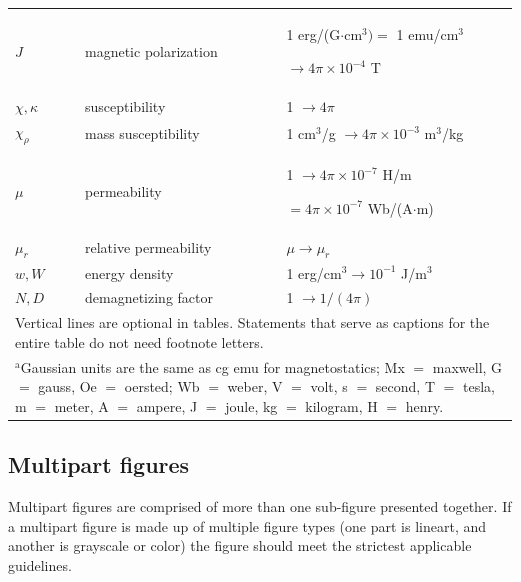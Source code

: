 \documentclass[journal,twoside,web]{ieeecolor}
\begin{document}
\begin{table}
\begin{tabular}{|p{25pt}|p{75pt}|p{115pt}|}
        $J$                                            &
        magnetic polarization                          &
        1 erg/(G$\cdot $cm$^{3}) =$ 1 emu/cm$^{3}$ \par $\to 4\pi \times  10^{-4}$ T    \\
        $\chi , \kappa $                               &
        susceptibility                                 &
        1 $\to  4\pi $                                                                  \\
        $\chi_{\rho }$                                 &
        mass susceptibility                            &
        1 cm$^{3}$/g $\to  4\pi \times  10^{-3}$ m$^{3}$/kg                             \\
        $\mu $                                         &
        permeability                                   &
        1 $\to  4\pi \times  10^{-7}$ H/m \par $= 4\pi \times  10^{-7}$ Wb/(A$\cdot $m) \\
        $\mu_{r}$                                      &
        relative permeability                          &
        $\mu \to \mu_{r}$                                                               \\
        $w, W$                                         &
        energy density                                 &
        1 erg/cm$^{3} \to  10^{-1}$ J/m$^{3}$                                           \\
        $N, D$                                         &
        demagnetizing factor                           &
        1 $\to  1/(4\pi )$                                                              \\
        \hline
        \multicolumn{3}{p{251pt}}{Vertical lines are optional in tables. Statements that serve as captions for
        the entire table do not need footnote letters. }                                \\
        \multicolumn{3}{p{251pt}}{$^{\mathrm{a}}$Gaussian units are the same as cg emu for magnetostatics; Mx
            $=$ maxwell, G $=$ gauss, Oe $=$ oersted; Wb $=$ weber, V $=$ volt, s $=$
            second, T $=$ tesla, m $=$ meter, A $=$ ampere, J $=$ joule, kg $=$
            kilogram, H $=$ henry.}
    \end{tabular}
    \label{tab1}
\end{table}

\subsection{Multipart figures}
Multipart figures are comprised of more than one sub-figure presented together.
If a multipart figure is made up of multiple figure types (one part is lineart,
and another is grayscale or color) the figure should meet the strictest applicable guidelines.
\end{document}
